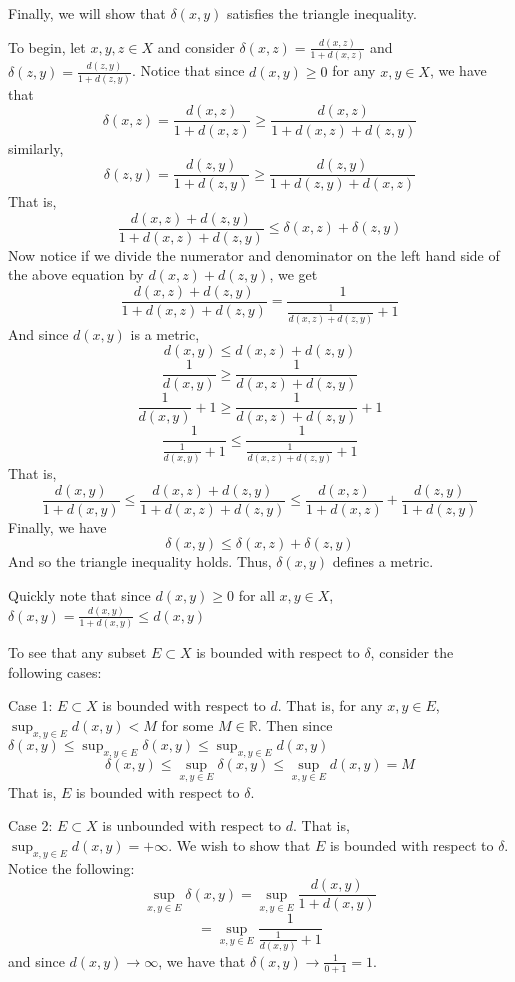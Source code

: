 \documentclass{article}
\begin{document}
\begin{enumerate}
\begin{enumerate}
        Finally, we will show that $\delta(x,y)$ satisfies the triangle inequality. 
        
        To begin, let $x,y,z \in X$ and consider $\delta(x,z) = \frac{d(x,z)}{1 + d(x,z)}$ and $\delta(z,y) = \frac{d(z,y)}{1 + d(z,y)}$. Notice that since $d(x,y) \geq 0$ for any $x,y \in X$, we have that
        \[\delta(x,z) = \frac{d(x,z)}{1 + d(x,z)} \geq \frac{d(x,z)}{1 + d(x,z) + d(z,y)}\]
        similarly,
        \[\delta(z,y) = \frac{d(z,y)}{1 + d(z,y)} \geq \frac{d(z,y)}{1 + d(z,y) + d(x,z)}\]
        That is,
        \[\frac{d(x,z) + d(z,y)}{1 + d(x,z) + d(z,y)} \leq \delta(x,z) + \delta(z,y)\]
        Now notice if we divide the numerator and denominator on the left hand side of the above equation by $d(x,z) + d(z,y)$, we get
        \[\frac{d(x,z) + d(z,y)}{1 + d(x,z) + d(z,y)} = \frac{1}{\frac{1}{d(x,z) + d(z,y)} + 1}\]
        And since $d(x,y)$ is a metric,
        \[d(x,y) \leq d(x,z) + d(z,y)\]
        \[\frac{1}{d(x,y)} \geq \frac{1}{d(x,z) + d(z,y)}\]
        \[\frac{1}{d(x,y)} + 1 \geq \frac{1}{d(x,z) + d(z,y)} + 1\]
        \[\frac{1}{\frac{1}{d(x,y)} + 1} \leq \frac{1}{\frac{1}{d(x,z) + d(z,y)} + 1}\]
        That is, 
        \[\frac{d(x,y)}{1 + d(x,y)} \leq \frac{d(x,z) + d(z,y)}{1 + d(x,z) + d(z,y)} \leq \frac{d(x,z)}{1 + d(x,z)} + \frac{d(z,y)}{1 + d(z,y)}\]
        Finally, we have
        \[\delta(x,y) \leq \delta(x,z) + \delta(z,y)\]
        And so the triangle inequality holds. Thus, $\delta(x,y)$ defines a metric.
        
        Quickly note that since $d(x,y) \geq 0$ for all $x,y \in X$, $\delta(x,y) = \frac{d(x,y)}{1 + d(x,y)} \leq d(x,y)$
        
        To see that any subset $E \subset X$ is bounded with respect to $\delta$, consider the following cases:
        
        Case 1: $E \subset X$ is bounded with respect to $d$. That is, for any $x,y \in E$, $\sup_{x,y \in E}{d(x,y)} < M$ for some $M \in \mathbb{R}$. Then since $\delta(x,y) \leq \sup_{x,y \in E} {\delta(x,y)} \leq \sup_{x,y \in E} {d(x,y)}$
        \[\delta(x,y) \leq \sup_{x,y \in E} {\delta(x,y)} \leq \sup_{x,y \in E} {d(x,y)} = M\]
        That is, $E$ is bounded with respect to $\delta$.
        
        Case 2: $E \subset X$ is unbounded with respect to $d$. That is, $\sup_{x,y \in E}{d(x,y)} = + \infty$. We wish to show that $E$ is bounded with respect to $\delta$. Notice the following:
        \[\sup_{x,y \in E} {\delta(x,y)} = \sup_{x,y \in E} {\frac{d(x,y)}{1 + d(x,y)}}\]
        \[ = \sup_{x,y \in E} {\frac{1}{\frac{1}{d(x,y)} + 1}}\]
        and since $d(x,y) \to \infty$, we have that $\delta(x,y) \to \frac{1}{0 + 1} = 1$.
        

\end{enumerate}
\end{enumerate}
\end{document}
